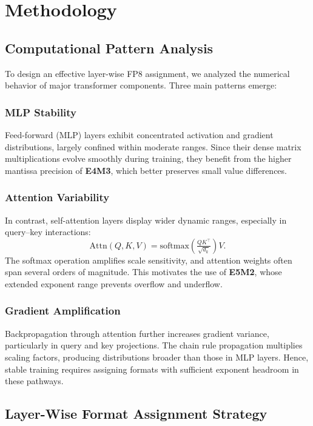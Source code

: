 \documentclass[conference]{IEEEtran}
\begin{document}
\section{Methodology}
\label{sec:methodology}
\subsection{Computational Pattern Analysis}

To design an effective layer-wise FP8 assignment, we analyzed the numerical behavior of major transformer components. Three main patterns emerge:

\subsubsection{MLP Stability}
Feed-forward (MLP) layers exhibit concentrated activation and gradient distributions, largely confined within moderate ranges. Since their dense matrix multiplications evolve smoothly during training, they benefit from the higher mantissa precision of \textbf{E4M3}, which better preserves small value differences.

\subsubsection{Attention Variability}
In contrast, self-attention layers display wider dynamic ranges, especially in query–key interactions:
\[
\text{Attn}(Q,K,V) = \mathrm{softmax}\!\left(\tfrac{QK^\top}{\sqrt{d_k}}\right)V.
\]
The softmax operation amplifies scale sensitivity, and attention weights often span several orders of magnitude. This motivates the use of \textbf{E5M2}, whose extended exponent range prevents overflow and underflow.

\subsubsection{Gradient Amplification}
Backpropagation through attention further increases gradient variance, particularly in query and key projections. The chain rule propagation multiplies scaling factors, producing distributions broader than those in MLP layers. Hence, stable training requires assigning formats with sufficient exponent headroom in these pathways.

\subsection{Layer-Wise Format Assignment Strategy}
\end{document}
